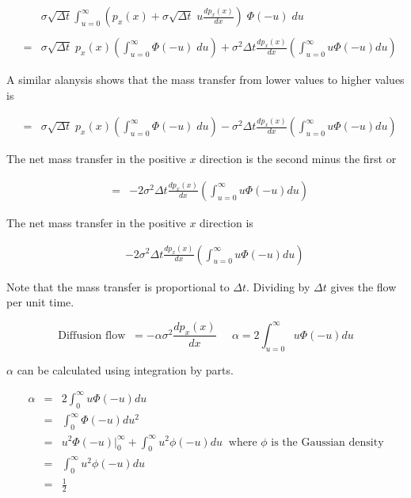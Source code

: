 {{\begin{eqnarray*}
&  & \sigma\sqrt{\Delta t} \int_{u = 0}^\infty \left(p_x(x)+\sigma\sqrt{\Delta t}\;u \frac{dp_x(x)}{dx}\right)\;\Phi(-u)\;du \\
\\
& = & \sigma\sqrt{\Delta t}\;p_x(x)\left(\int_{u=0}^\infty \Phi(-u)\;du\right) +  \sigma^2\Delta t \frac{dp_x(x)}{dx} \left(\int_{u=0}^\infty u\Phi(-u) du\right)
\end{eqnarray*}

A similar alanysis shows that the mass transfer from lower values to higher values is

\begin{eqnarray*}
& = & \sigma\sqrt{\Delta t}\;p_x(x)\left(\int_{u=0}^\infty \Phi(-u)\;du\right) -  \sigma^2\Delta t \frac{dp_x(x)}{dx} \left(\int_{u=0}^\infty u\Phi(-u) du\right)
\end{eqnarray*}

\vfill
The net mass transfer in the positive $x$ direction is the second minus the first or

\begin{eqnarray*}
& = & - 2\sigma^2\Delta t \frac{dp_x(x)}{dx} \left(\int_{u=0}^\infty u\Phi(-u) du\right)
\end{eqnarray*}
}

{\Large

The net mass transfer in the positive $x$ direction is

\begin{eqnarray*}
& & - 2\sigma^2\Delta t \frac{dp_x(x)}{dx} \left(\int_{u=0}^\infty u\Phi(-u) du\right)
\end{eqnarray*}

\vfill
Note that the mass transfer is proportional to $\Delta t$.  Dividing by $\Delta t$ gives the flow per unit time.

\vfill
$$\mbox{Diffusion flow}\;\;= - \alpha \sigma^2 \frac{dp_x(x)}{dx}\;\;\;\;\;\alpha = 2\int_{u=0}^\infty u\Phi(-u) du$$

\vfill
$\alpha$ can be calculated using integration by parts.

\begin{eqnarray*}
\alpha & = & 2 \int_{0}^\infty u \Phi(-u)du \\
& = & \int_{0}^\infty \Phi(-u)du^2 \\
& = & u^2 \Phi(-u)|_{0}^{\infty}+\int_{0}^\infty u^2 \phi(-u)du \;\;\mbox{where $\phi$ is the Gaussian density} \\
& = & \int_{0}^\infty u^2 \phi(-u)du\\
& = & \frac{1}{2}
\end{eqnarray*}}

}
